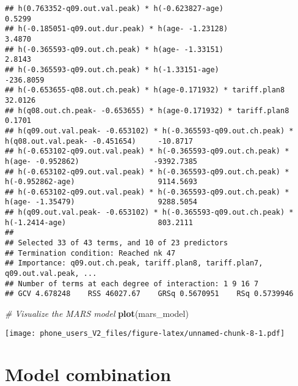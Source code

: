 \documentclass[
]{article}
\newenvironment{Shaded}{\begin{snugshade}}{\end{snugshade}}
\newcommand{\CommentTok}[1]{\textcolor[rgb]{0.56,0.35,0.01}{\textit{#1}}}
\newcommand{\FunctionTok}[1]{\textcolor[rgb]{0.13,0.29,0.53}{\textbf{#1}}}
\newcommand{\NormalTok}[1]{#1}
\newcommand{\OtherTok}[1]{\textcolor[rgb]{0.56,0.35,0.01}{#1}}
\newcommand{\SpecialCharTok}[1]{\textcolor[rgb]{0.81,0.36,0.00}{\textbf{#1}}}
\begin{document}
\begin{verbatim}
## h(0.763352-q09.out.val.peak) * h(-0.623827-age)                                                      0.5299
## h(-0.185051-q09.out.dur.peak) * h(age- -1.23128)                                                     3.4870
## h(-0.365593-q09.out.ch.peak) * h(age- -1.33151)                                                      2.8143
## h(-0.365593-q09.out.ch.peak) * h(-1.33151-age)                                                    -236.8059
## h(-0.653655-q08.out.ch.peak) * h(age-0.171932) * tariff.plan8                                       32.0126
## h(q08.out.ch.peak- -0.653655) * h(age-0.171932) * tariff.plan8                                       0.1701
## h(q09.out.val.peak- -0.653102) * h(-0.365593-q09.out.ch.peak) * h(q08.out.val.peak- -0.451654)     -10.8717
## h(-0.653102-q09.out.val.peak) * h(-0.365593-q09.out.ch.peak) * h(age- -0.952862)                 -9392.7385
## h(-0.653102-q09.out.val.peak) * h(-0.365593-q09.out.ch.peak) * h(-0.952862-age)                   9114.5693
## h(-0.653102-q09.out.val.peak) * h(-0.365593-q09.out.ch.peak) * h(age- -1.35479)                   9288.5054
## h(q09.out.val.peak- -0.653102) * h(-0.365593-q09.out.ch.peak) * h(-1.2414-age)                     803.2111
## 
## Selected 33 of 43 terms, and 10 of 23 predictors
## Termination condition: Reached nk 47
## Importance: q09.out.ch.peak, tariff.plan8, tariff.plan7, q09.out.val.peak, ...
## Number of terms at each degree of interaction: 1 9 16 7
## GCV 4.678248    RSS 46027.67    GRSq 0.5670951    RSq 0.5739946
\end{verbatim}

\begin{Shaded}
\begin{Highlighting}[]
\CommentTok{\# Visualize the MARS model}
\FunctionTok{plot}\NormalTok{(mars\_model)}
\end{Highlighting}
\end{Shaded}

\texttt{[image: phone\_users\_V2\_files/figure-latex/unnamed-chunk-8-1.pdf]}

\begin{Shaded}
\end{Shaded}

\hypertarget{model-combination}{%
\section{Model combination}\label{model-combination}}
\end{document}
